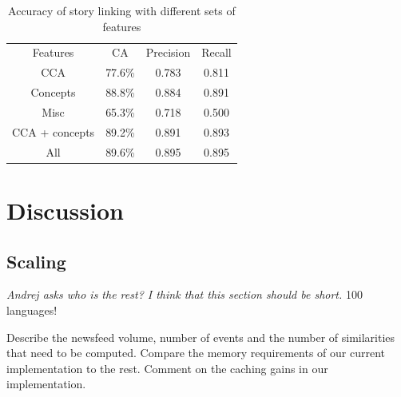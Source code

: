 \documentclass[twoside,11pt]{article}
\begin{document}
\begin{table}[h]
\caption{Accuracy of story linking with different sets of features}
\label{table:linkingEval}
\begin{center}
\begin{tabular}{|c|c|c|c|}
  \hline
  \cline{1-4}
  Features & CA & Precision & Recall \\ \cline{1-4}
  CCA & 77.6\% & 0.783 & 0.811 \\ \cline{1-4}
  Concepts & 88.8\% & 0.884 & 0.891 \\ \cline{1-4}
  Misc & 65.3\% & 0.718 & 0.500 \\ \cline{1-4}
  CCA + concepts & 89.2\% & 0.891 & 0.893 \\ \cline{1-4}
  All & 89.6\% & 0.895 & 0.895 \\ \cline{1-4}
  \hline
\end{tabular}
\end{center}
\end{table}


\section{Discussion}


\subsection{Scaling}
\emph{Andrej asks who is the rest? I think that this section should be short.}
100 languages!

Describe the newsfeed volume, number of events and the number of similarities that need to be computed. Compare the memory requirements of our current implementation to the rest.
Comment on the caching gains in our implementation.



\vskip 0.2in
%

\end{document}
